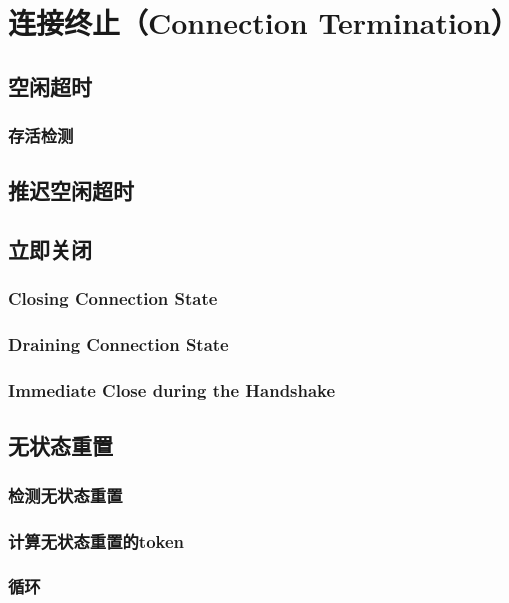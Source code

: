 \section{连接终止（Connection Termination）}

\subsection{空闲超时}

\subsubsection{存活检测}

\subsection{推迟空闲超时}

\subsection{立即关闭}

\subsubsection{Closing Connection State}
\subsubsection{Draining Connection State}
\subsubsection{Immediate Close during the Handshake}

\subsection{无状态重置}

\subsubsection{检测无状态重置}
\subsubsection{计算无状态重置的token}
\subsubsection{循环}